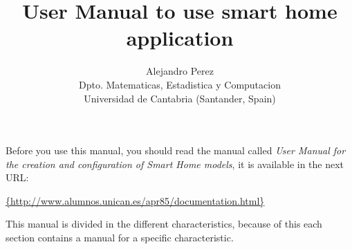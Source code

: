 \documentclass[a4paper,11pt]{article}
\title{User Manual to use smart home application}
\author{Alejandro Perez \\ Dpto. Matematicas, Estadistica y Computacion \\
		Universidad de Cantabria (Santander, Spain)}
\begin{document}
\maketitle

Before you use this manual, you should read the manual called \emph{User Manual for the creation and configuration of Smart Home models}, it is available in the next URL: 

\url{{http://www.alumnos.unican.es/apr85/documentation.html}}

This manual is divided in the different characteristics, because of this each section contains a manual for a specific characteristic.













\end{document}

